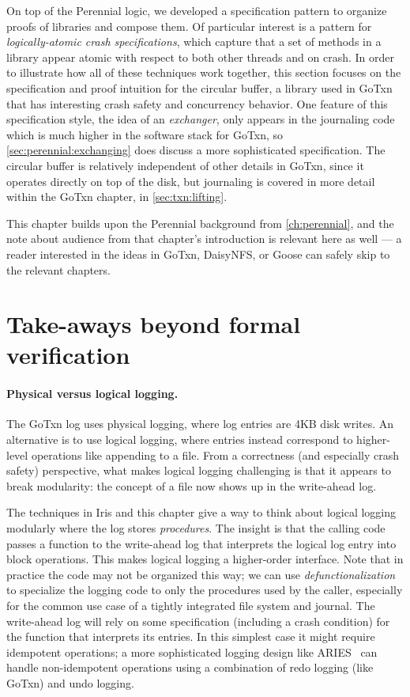 On top of the Perennial logic, we developed a specification pattern to organize
proofs of libraries and compose them. Of particular interest is a pattern for
\emph{logically-atomic crash specifications}, which capture that a set of
methods in a library appear atomic with respect to both other threads and on
crash. In order to illustrate how all of these techniques work together, this
section focuses on the specification and proof intuition for the circular
buffer, a library used in GoTxn that has interesting crash safety and
concurrency behavior. One feature of this specification style, the idea of an
\emph{exchanger}, only appears in the journaling code which is much higher in
the software stack for GoTxn, so \cref{sec:perennial:exchanging} does discuss a
more sophisticated specification. The circular buffer is relatively independent
of other details in GoTxn, since it operates directly on top of the disk, but
journaling is covered in more detail within the GoTxn chapter, in
\cref{sec:txn:lifting}.

This chapter builds upon the Perennial background from \cref{ch:perennial}, and
the note about audience from that chapter's introduction is relevant here as
well --- a reader interested in the ideas in GoTxn, DaisyNFS, or Goose can
safely skip to the relevant chapters.




\section{Take-aways beyond formal verification}

\paragraph{Physical versus logical logging.} The GoTxn log uses physical
logging, where log entries are 4KB disk writes. An alternative is to use logical
logging, where entries instead correspond to higher-level operations like
appending to a file. From a correctness (and especially crash safety)
perspective, what makes logical logging challenging is that it appears to break
modularity: the concept of a file now shows up in the write-ahead log.

The techniques in Iris and this chapter give a way to think about logical
logging modularly where the log stores \emph{procedures}. The insight is that
the calling code passes a function to the write-ahead log that interprets the
logical log entry into block operations. This makes logical logging a
higher-order interface. Note that in practice the code may not be organized this
way; we can use \emph{defunctionalization} to specialize the logging code to
only the procedures used by the caller, especially for the common use case of a
tightly integrated file system and journal. The write-ahead log will rely on
some specification (including a crash condition) for the function that
interprets its entries. In this simplest case it might require idempotent
operations; a more sophisticated logging design like ARIES~\cite{mohan:aries}
can handle non-idempotent operations using a combination of redo logging (like
GoTxn) and undo logging.
